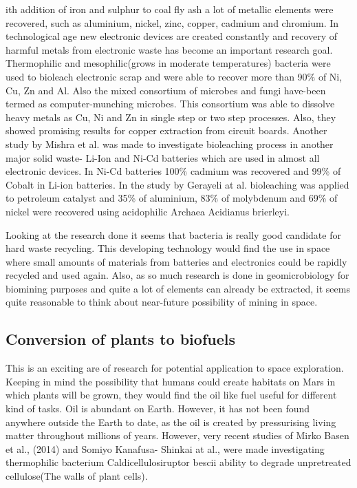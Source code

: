 \documentclass[12pt]{article}
\begin{document}
ith addition of iron and sulphur to coal fly ash a lot of metallic elements were recovered, such as aluminium, nickel, zinc, copper, cadmium and chromium. In technological age new electronic devices are created constantly and recovery of harmful metals from electronic waste has become an important research goal. Thermophilic and mesophilic(grows in moderate temperatures) bacteria were used to bioleach electronic scrap and were able to recover more than 90\% of Ni, Cu, Zn and Al. Also the mixed consortium of microbes and fungi have-been
termed as computer-munching microbes. This consortium was able to dissolve heavy metals as Cu, Ni and Zn in single step or two step processes. Also, they showed promising results for copper extraction from circuit boards. Another study by Mishra et al.\cite{} was made to investigate bioleaching process in another major solid waste- Li-Ion and Ni-Cd batteries which are used in
almost all electronic devices. In Ni-Cd batteries 100\% cadmium was recovered and 99\% of Cobalt in Li-ion batteries. In the study by Gerayeli at al. bioleaching was applied to petroleum catalyst and 35\% of aluminium, 83\% of molybdenum and 69\% of nickel were recovered using acidophilic Archaea Acidianus brierleyi. 

Looking at the research done it seems that bacteria is really good candidate for hard waste recycling. This developing technology would find the use in space where small amounts of materials from batteries and electronics could be rapidly recycled and used again. Also, as so much research is done in geomicrobiology for biomining purposes and quite a lot of elements can already be extracted, it seems quite reasonable to think about near-future possibility of mining in space.

\subsection{Conversion of plants to biofuels}

This is an exciting are of research for potential application to space exploration. Keeping in mind the possibility that humans could create habitats on Mars in which plants will be grown, they would find the oil like fuel useful for different kind of tasks. Oil is abundant on Earth. However, it has not been found anywhere outside the Earth to date, as the oil is created by pressurising living matter throughout millions of years. However, very recent studies of Mirko Basen et al., (2014)  and Somiyo Kanafusa- Shinkai at al., were made investigating thermophilic
bacterium Caldicellulosiruptor bescii ability to degrade unpretreated cellulose(The walls of plant cells).
\end{document}
